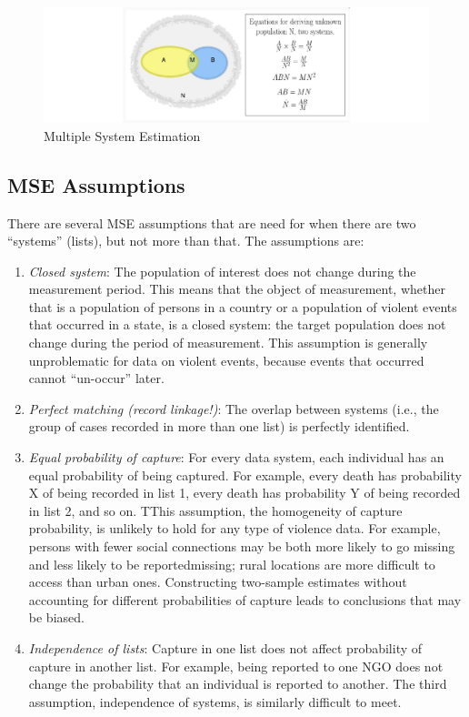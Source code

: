 \documentclass[]{article}
\begin{document}
\begin{figure}
\centering
\includegraphics{Categorical-FinalProject_files/figure-latex/img.MSE-1.pdf}
\caption{Multiple System Estimation}
\end{figure}

\hypertarget{mse-assumptions}{%
\subsection{MSE Assumptions}\label{mse-assumptions}}

There are several MSE assumptions that are need for when there are two
``systems'' (lists), but not more than that. The assumptions are:

\begin{enumerate}
\def\labelenumi{\arabic{enumi}.}
\item
  \emph{Closed system}: The population of interest does not change
  during the measurement period. This means that the object of
  measurement, whether that is a population of persons in a country or a
  population of violent events that occurred in a state, is a closed
  system: the target population does not change during the period of
  measurement. This assumption is generally unproblematic for data on
  violent events, because events that occurred cannot ``un-occur''
  later.
\item
  \emph{Perfect matching (record linkage!)}: The overlap between systems
  (i.e., the group of cases recorded in more than one list) is perfectly
  identified.
\item
  \emph{Equal probability of capture}: For every data system, each
  individual has an equal probability of being captured. For example,
  every death has probability X of being recorded in list 1, every death
  has probability Y of being recorded in list 2, and so on. TThis
  assumption, the homogeneity of capture probability, is unlikely to
  hold for any type of violence data. For example, persons with fewer
  social connections may be both more likely to go missing and less
  likely to be reportedmissing; rural locations are more difficult to
  access than urban ones. Constructing two-sample estimates without
  accounting for different probabilities of capture leads to conclusions
  that may be biased.
\item
  \emph{Independence of lists}: Capture in one list does not affect
  probability of capture in another list. For example, being reported to
  one NGO does not change the probability that an individual is reported
  to another. The third assumption, independence of systems, is
  similarly difficult to meet.
\end{enumerate}
\end{document}
